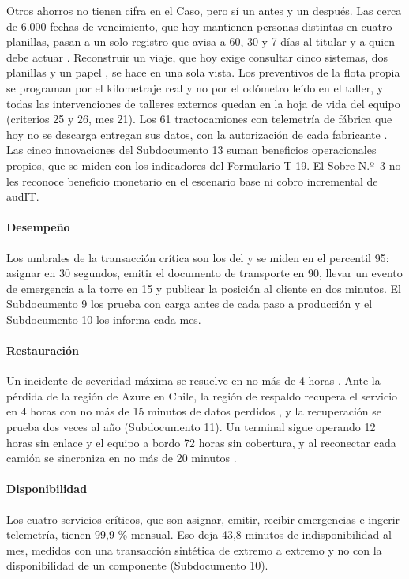 Otros ahorros no tienen cifra en el Caso, pero sí un antes y un después. Las cerca de 6.000 fechas de
vencimiento, que hoy mantienen personas distintas en cuatro planillas, pasan a un solo registro que
avisa a 60, 30 y 7 días al titular y a quien debe actuar . Reconstruir un viaje,
que hoy exige consultar cinco sistemas, dos planillas y un papel , se hace en
una sola vista. Los preventivos de la flota propia se programan por el kilometraje real y no por el
odómetro leído en el taller, y todas las intervenciones de talleres externos quedan en la hoja de vida
del equipo (criterios 25 y 26, mes 21). Los 61 tractocamiones con telemetría de fábrica que hoy no se
descarga entregan sus datos, con la autorización de cada fabricante . Las cinco
innovaciones del Subdocumento 13 suman beneficios operacionales propios, que se miden con los
indicadores del Formulario T-19. El Sobre N.º~3 no les reconoce beneficio monetario en el escenario
base ni cobro incremental de audIT.

\paragraph{Desempeño} Los umbrales de la transacción crítica son los del  y se miden
en el percentil 95: asignar en 30 segundos, emitir el documento de transporte en 90, llevar un evento de
emergencia a la torre en 15 y publicar la posición al cliente en dos minutos. El Subdocumento 9 los
prueba con carga antes de cada paso a producción y el Subdocumento 10 los informa cada mes.

\paragraph{Restauración} Un incidente de severidad máxima se resuelve en no más de 4 horas
. Ante la pérdida de la región de Azure en Chile, la región de respaldo recupera el
servicio en 4 horas con no más de 15 minutos de datos perdidos , y la recuperación
se prueba dos veces al año (Subdocumento 11). Un terminal sigue operando 12 horas sin enlace y el equipo a
bordo 72 horas sin cobertura, y al reconectar cada camión se sincroniza en no más de 20 minutos
.

\paragraph{Disponibilidad} Los cuatro servicios críticos, que son asignar, emitir, recibir emergencias e
ingerir telemetría, tienen 99,9 \% mensual. Eso deja 43,8 minutos de indisponibilidad al mes, medidos
con una transacción sintética de extremo a extremo y no con la disponibilidad de un componente
(Subdocumento 10).

